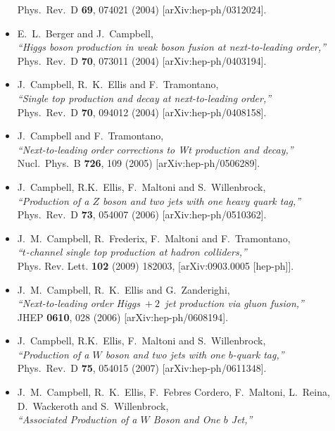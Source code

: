 \documentclass[12pt]{article}
\begin{document}
\begin{itemize}
  Phys.\ Rev.\ D {\bf 69}, 074021 (2004)
  [arXiv:hep-ph/0312024].
\item E.~L.~Berger and J.~Campbell, \\
  {\it ``Higgs boson production in weak boson fusion at next-to-leading order,''} \\
  Phys.\ Rev.\ D {\bf 70}, 073011 (2004)
  [arXiv:hep-ph/0403194].
\item J.~Campbell, R.~K.~Ellis and F.~Tramontano, \\
  {\it ``Single top production and decay at next-to-leading order,''} \\
  Phys.\ Rev.\ D {\bf 70}, 094012 (2004)
  [arXiv:hep-ph/0408158].
\item J.~Campbell and F.~Tramontano, \\
  {\it ``Next-to-leading order corrections to Wt production and
  decay,''} \\
  Nucl.\ Phys.\ B {\bf 726}, 109 (2005)
  [arXiv:hep-ph/0506289].
\item J.~Campbell, R.K.~Ellis, F.~Maltoni and S.~Willenbrock, \\
  {\it ``Production of a $Z$ boson and two jets with one heavy quark tag,''} \\
  Phys.\ Rev.\ D {\bf 73}, 054007 (2006)
  [arXiv:hep-ph/0510362].
\item J.~M.~Campbell, R.~Frederix, F.~Maltoni and F.~Tramontano,\\
  {\it ``$t$-channel single top production at hadron colliders,''} \\ 
  Phys. Rev. Lett. {\bf 102} (2009) 182003,
  [arXiv:0903.0005 [hep-ph]].
\item J.~M.~Campbell, R.~K.~Ellis and G.~Zanderighi, \\
  {\it ``Next-to-leading order Higgs~$+~2$~jet production via gluon fusion,''} \\
  JHEP {\bf 0610}, 028 (2006)
  [arXiv:hep-ph/0608194].
\item J.~Campbell, R.K.~Ellis, F.~Maltoni and S.~Willenbrock, \\
  {\it ``Production of a $W$ boson and two jets with one $b$-quark
  tag,''} \\
  Phys.\ Rev.\ D {\bf 75}, 054015 (2007)
  [arXiv:hep-ph/0611348].
\item J.~M.~Campbell, R.~K.~Ellis, F.~Febres Cordero, F.~Maltoni, L.~Reina, D.~Wackeroth and S.~Willenbrock, \\
  {\it ``Associated Production of a $W$ Boson and One $b$ Jet,''} \\

\end{itemize}
\end{document}
